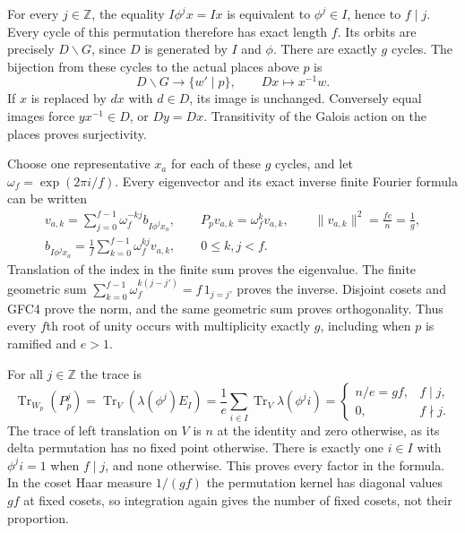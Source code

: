 For every $j\in\mathbb Z$, the equality $I\phi^jx=Ix$ is equivalent
to $\phi^j\in I$, hence to $f\mid j$. Every cycle of this permutation
therefore has exact length $f$. Its orbits are precisely $D\backslash G$,
since $D$ is generated by $I$ and $\phi$. There are exactly $g$ cycles.
The bijection from these cycles to the actual places above $p$ is
\begin{equation}\tag{GFC5}
 D\backslash G\longrightarrow\{w'\mid p\},\qquad
 Dx\longmapsto x^{-1}w.
\end{equation}
If $x$ is replaced by $dx$ with $d\in D$, its image is unchanged.
Conversely equal images force $yx^{-1}\in D$, or $Dy=Dx$.
Transitivity of the Galois action on the places proves surjectivity.

Choose one representative $x_a$ for each of these $g$ cycles, and let
$\omega_f=\exp(2\pi i/f)$. Every eigenvector and its exact inverse
finite Fourier formula can be written
\begin{equation}\tag{GFC6}
 \begin{gathered}
 v_{a,k}=\sum_{j=0}^{f-1}\omega_f^{-kj}b_{I\phi^jx_a},\qquad
 P_pv_{a,k}=\omega_f^k v_{a,k},\qquad
 \|v_{a,k}\|^2=\frac{fe}{n}=\frac1g,\\
 b_{I\phi^jx_a}=\frac1f\sum_{k=0}^{f-1}\omega_f^{kj}v_{a,k},
 \qquad 0\le k,j<f.
 \end{gathered}
\end{equation}
Translation of the index in the finite sum proves the eigenvalue.
The finite geometric sum $\sum_{k=0}^{f-1}\omega_f^{k(j-j')}=
f\,1_{j=j'}$ proves the inverse. Disjoint cosets and GFC4 prove the
norm, and the same geometric sum proves orthogonality. Thus every
$f$th root of unity occurs with multiplicity exactly $g$, including
when $p$ is ramified and $e>1$.

For all $j\in\mathbb Z$ the trace is
\begin{equation}\tag{GFC7}
 \operatorname{Tr}_{W_p}(P_p^j)
   =\operatorname{Tr}_{V}(\lambda(\phi^j)E_I)
   =\frac1e\sum_{i\in I}\operatorname{Tr}_V\lambda(\phi^ji)
   =\begin{cases}n/e=gf,&f\mid j,\\0,&f\nmid j.\end{cases}
\end{equation}
The trace of left translation on $V$ is $n$ at the identity and zero
otherwise, as its delta permutation has no fixed point otherwise.
There is exactly one $i\in I$ with $\phi^ji=1$ when $f\mid j$,
and none otherwise. This proves every factor in the formula. In the
coset Haar measure $1/(gf)$ the permutation kernel has diagonal values
$gf$ at fixed cosets, so integration again gives the number of fixed
cosets, not their proportion.


